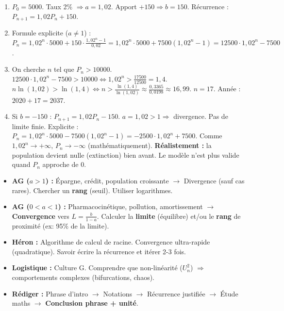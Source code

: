 \documentclass[11pt]{article}
\begin{document}
\begin{corrige}
\begin{enumerate}
    \item $P_0 = 5000$. Taux 2\% $\Rightarrow a = 1{,}02$. Apport $+150 \Rightarrow b = 150$.
    Récurrence : $\boxed{P_{n+1} = 1{,}02 P_n + 150}$.
    \item Formule explicite ($a \neq 1$) :
    $P_n = 1{,}02^n \cdot 5000 + 150 \cdot \frac{1{,}02^n - 1}{0{,}02} = 1{,}02^n \cdot 5000 + 7500(1{,}02^n - 1) = 12500 \cdot 1{,}02^n - 7500$.
    \item On cherche $n$ tel que $P_n > 10000$.
    $12500 \cdot 1{,}02^n - 7500 > 10000 \iff 1{,}02^n > \frac{17500}{12500} = 1{,}4$.
    $n \ln(1{,}02) > \ln(1{,}4) \iff n > \frac{\ln(1{,}4)}{\ln(1{,}02)} \approx \frac{0{,}3365}{0{,}0198} \approx 16{,}99$.
    $n = 17$. Année : $2020 + 17 = \boxed{2037}$.
    \item Si $b = -150$ : $P_{n+1} = 1{,}02 P_n - 150$.
    $a=1{,}02 > 1 \Rightarrow$ divergence. Pas de limite finie.
    Explicite : $P_n = 1{,}02^n \cdot 5000 - 7500(1{,}02^n - 1) = -2500 \cdot 1{,}02^n + 7500$.
    Comme $1{,}02^n \to +\infty$, $P_n \to -\infty$ (mathématiquement). \textbf{Réalistement :} la population devient nulle (extinction) bien avant. Le modèle n'est plus valide quand $P_n$ approche de 0.
\end{enumerate}
\end{corrige}

\begin{aretenir}
\begin{itemize}
    \item \textbf{AG ($a>1$) :} Épargne, crédit, population croissante $\to$ Divergence (sauf cas rares). Chercher un \textbf{rang} (seuil). Utiliser logarithmes.
    \item \textbf{AG ($0<a<1$) :} Pharmacocinétique, pollution, amortissement $\to$ \textbf{Convergence} vers $L = \frac{b}{1-a}$. Calculer la \textbf{limite} (équilibre) et/ou le \textbf{rang} de proximité (ex: 95\% de la limite).
    \item \textbf{Héron :} Algorithme de calcul de racine. Convergence ultra-rapide (quadratique). Savoir écrire la récurrence et itérer 2-3 fois.
    \item \textbf{Logistique :} Culture G. Comprendre que non-linéarité ($U_n^2$) $\Rightarrow$ comportements complexes (bifurcations, chaos).
    \item \textbf{Rédiger :} Phrase d'intro $\to$ Notations $\to$ Récurrence justifiée $\to$ Étude maths $\to$ \textbf{Conclusion phrase + unité}.
\end{itemize}
\end{aretenir}
\end{document}
